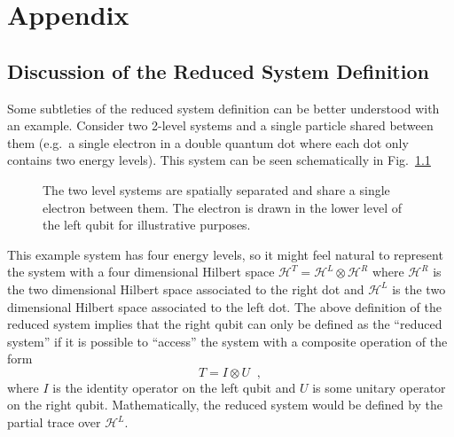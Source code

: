 \chapter{Appendix}

\section{Discussion of the Reduced System Definition}
\label{sec:redsysdef}
Some subtleties of the reduced system definition can be better understood with an example.  Consider two 2-level systems and a single particle shared between them (e.g.\ a single electron in a double quantum dot where each dot only contains two energy levels).  This system can be seen schematically in Fig.\ \ref{fig:ddqd}
\begin{figure}[th]
\centering
{}
\caption{The two level systems are spatially separated and share a single electron between them.  The electron is drawn in the lower level of the left qubit for illustrative purposes.}
\label{fig:ddqd}
\end{figure}

This example system has four energy levels, so it might feel natural to represent the system with a four dimensional Hilbert space $\mathcal{H}^T = \mathcal{H}^L\otimes\mathcal{H}^R$ where $\mathcal{H}^R$ is the two dimensional Hilbert space associated to the right dot and $\mathcal{H}^L$ is the two dimensional Hilbert space associated to the left dot.  The above definition of the reduced system implies that the right qubit can only be defined as the ``reduced system'' if it is possible to ``access'' the system with a composite operation of the form
$$
T = I\otimes U\;\;,
$$
where $I$ is the identity operator on the left qubit and $U$ is some unitary operator on the right qubit.  Mathematically, the reduced system would be defined by the partial trace over $\mathcal{H}^L$.

